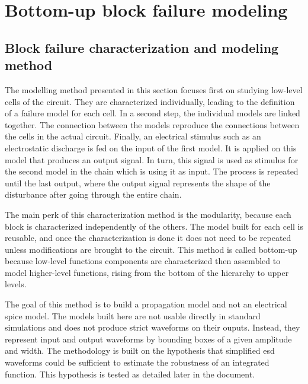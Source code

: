 \section{Bottom-up block failure modeling}
\label{sec:bottom-up-modeling}

\subsection{Block failure characterization and modeling method}
\label{sec:block-failure-cz}

The modelling method presented in this section focuses first on studying low-level cells of the circuit.
They are characterized individually, leading to the definition of a failure model for each cell.
In a second step, the individual models are linked together.
The connection between the models reproduce the connections between the cells in the actual circuit.
Finally, an electrical stimulus such as an electrostatic discharge is fed on the input of the first model.
It is applied on this model that produces an output signal.
In turn, this signal is used as stimulus for the second model in the chain which is using it as input.
The process is repeated until the last output, where the output signal represents the shape of the disturbance after going through the entire chain.

The main perk of this characterization method is the modularity, because each block is characterized independently of the others.
The model built for each cell is reusable, and once the characterization is done it does not need to be repeated unless modifications are brought to the circuit.
This method is called bottom-up because low-level functions components are characterized then assembled to model higher-level functions, rising from the bottom of the hierarchy to upper levels.

The goal of this method is to build a propagation model and not an electrical \gls{spice} model.
The models built here are not usable directly in standard simulations and does not produce strict waveforms on their ouputs.
Instead, they represent input and output waveforms by bounding boxes of a given amplitude and width.
The methodology is built on the hypothesis that simplified \gls{esd} waveforms could be sufficient to estimate the robustness of an integrated function.
This hypothesis is tested as detailed later in the document.

